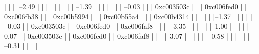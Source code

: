                           |          |          |          |--2.49%
                          |          |          |          |          |          
                          |          |          |          |           --1.39%
                          |          |          |          |          
                          |          |          |           --0.03%
                          |          |          |                     0xc003503c
                          |          |          |                     0xc006fed0
                          |          |          |                     0xc006fb38
                          |          |          |                     0xc00b5994
                          |          |          |                     0xc00b55a4
                          |          |          |                     0xc00b4314
                          |          |          |          
                          |          |          |--1.37%
                          |          |          |          
                          |          |           --0.03%
                          |          |                     0xc003503c
                          |          |                     0xc006fed0
                          |          |                     0xc006faf8
                          |          |          
                          |          |--3.35%
                          |          |          |          
                          |          |          |--1.00%
                          |          |          |          
                          |          |           --0.07%
                          |          |                     0xc003503c
                          |          |                     0xc006fed0
                          |          |                     0xc006faf8
                          |          |          
                          |          |--3.07%
                          |          |          |          
                          |          |          |--0.58%
                          |          |          |          |          
                          |          |          |           --0.31%
                          |          |          |                     |          
